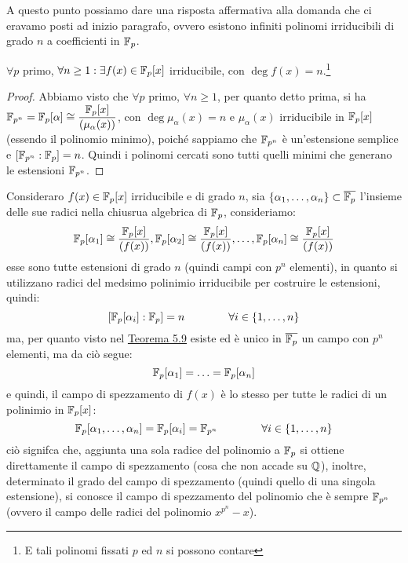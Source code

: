 \documentclass[11pt]{scrartcl}
\begin{document}
A questo punto possiamo dare una risposta affermativa alla domanda che ci eravamo posti ad inizio paragrafo, ovvero esistono infiniti
polinomi irriducibili di grado $n$ a coefficienti in ${\mathbb F}_p$.

\begin{corollary}
	$\forall p$ primo, $\forall n \geq 1: \exists f(x) \in {\mathbb F}_p[x]$ irriducibile, con $\deg f(x) = n$.\footnote{E tali polinomi fissati $p$ ed $n$ si possono contare}
\end{corollary}

\begin{proof}
	Abbiamo visto che $\forall p$ primo, $\forall n \geq 1$, per quanto detto prima, si ha $\mathbb{F}_{p^{n}} = {\mathbb F}_p[\alpha] \cong \displaystyle\frac{{\mathbb F}_p[x]}{(\mu_\alpha(x))}$,
	con $\deg\mu_\alpha(x)=n$ e $\mu_\alpha(x)$ irriducibile in ${\mathbb F}_p[x]$ (essendo il polinomio minimo), poiché sappiamo che $\mathbb{F}_{p^{n}}$ è un'estensione semplice e 
	$[\mathbb{F}_{p^{n}}:{\mathbb F}_p] = n$. Quindi i polinomi cercati sono tutti quelli minimi che generano le estensioni $\mathbb{F}_{p^{n}}$.
\end{proof}

\begin{remark}
Consideraro $f(x) \in {\mathbb F}_p[x]$ irriducibile e di grado $n$, sia $\{\alpha_1,\ldots,\alpha_n\} \subset \overline{{\mathbb F}_p}$
l'insieme delle sue radici nella chiusrua algebrica di ${\mathbb F}_p$, consideriamo:
	\[ {\mathbb F}_p[\alpha_1] \cong \frac{{\mathbb F}_p[x]}{(f(x))}, {\mathbb F}_p[\alpha_2] \cong \frac{{\mathbb F}_p[x]}{(f(x))}, \ldots,
	{\mathbb F}_p[\alpha_n] \cong \frac{{\mathbb F}_p[x]}{(f(x))}
		\]
	esse sono tutte estensioni di grado $n$ (quindi campi con $p^n$ elementi), in quanto si utilizzano radici del medsimo polinimio irriducibile per costruire le estensioni, quindi:
		\[ [{\mathbb F}_p[\alpha_i] : {\mathbb F}_p] = n
		\qquad\qquad
		\forall i \in \{1,\ldots,n\}
			\] 
	ma, per quanto visto nel \hyperref[cf:5.9]{Teorema 5.9} esiste ed è unico in $\overline{{\mathbb F}_p}$ un campo con $p^n$ elementi, ma da ciò segue:
		\[{\mathbb F}_p[\alpha_1] = \ldots = {\mathbb F}_p[\alpha_n]
			\]
	e quindi, il campo di spezzamento di $f(x)$ è lo stesso per tutte le radici di un polinimio in ${\mathbb F}_p[x]$:
		\[ {\mathbb F}_p[\alpha_1,\ldots,\alpha_n] = {\mathbb F}_p[\alpha_i] = \mathbb{F}_{p^{n}}
		\qquad\qquad\forall i \in \{1,\ldots,n\}
			\]
	ciò signifca che, aggiunta una sola radice del polinomio a ${\mathbb F}_p$ si ottiene direttamente il campo di spezzamento (cosa che non accade su $\mathbb Q$),
	inoltre, determinato il grado del campo di spezzamento (quindi quello di una singola estensione), si conosce il campo di spezzamento del polinomio che
	è sempre $\mathbb{F}_{p^{n}}$ (ovvero il campo delle radici del polinomio $x^{p^n} - x$).
\end{remark}
\end{document}
